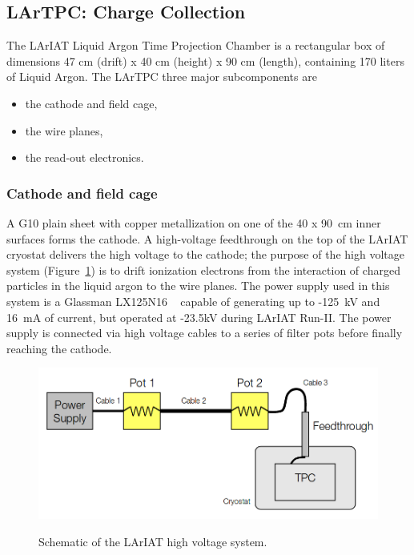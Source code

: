 \subsection{LArTPC: Charge Collection}\label{sec:TPCCharge}
The LArIAT Liquid Argon Time Projection Chamber is a rectangular box of dimensions 47 cm (drift) x 40 cm (height) x 90 cm (length), containing 170 liters of Liquid Argon.
The LArTPC three major subcomponents are 
\begin{itemize} 
\item[1)] the cathode and field cage,
\item [2)] the wire planes, 
\item [3)] the read-out electronics. %
\end{itemize}





\subsubsection{Cathode and field cage}
A G10 plain sheet with copper metallization on one of the 40 x 90~cm inner surfaces forms the cathode. 
A high-voltage feedthrough on the top of the LArIAT cryostat delivers the high voltage to the cathode; the purpose of the high voltage system (Figure~\ref{fig:HVScheme}) is to drift ionization electrons from the interaction of charged particles in the liquid argon to the wire planes.  The power supply used in this system is a Glassman LX125N16 ~\cite{GlassmanPS} capable of generating up to -125~kV and 16~mA of current, but operated at -23.5kV during LArIAT Run-II. The power supply is connected via high voltage cables to a series of filter pots before finally reaching the cathode. 

\begin{figure}[htb]
\centering
\includegraphics[scale=0.35]{Chapter-3/Images//HVSchematic.png}\\
\caption{Schematic of the LArIAT high voltage system.}
\label{fig:HVScheme}
\end{figure}%



